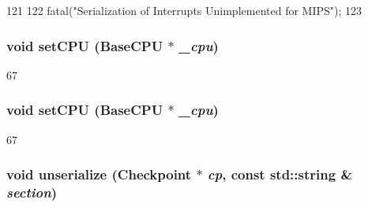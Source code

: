 \begin{DoxyCode}
121     {
122         fatal("Serialization of Interrupts Unimplemented for MIPS");
123     }
\end{DoxyCode}
\hypertarget{classMipsISA_1_1Interrupts_a2ab8c6aed9969bc58d6aa2427d442cc4}{
\subsubsection[{setCPU}]{\setlength{\rightskip}{0pt plus 5cm}void setCPU ({\bf BaseCPU} $\ast$ {\em \_\-cpu})}}
\label{classMipsISA_1_1Interrupts_a2ab8c6aed9969bc58d6aa2427d442cc4}



\begin{DoxyCode}
67     {}
\end{DoxyCode}
\hypertarget{classMipsISA_1_1Interrupts_a2ab8c6aed9969bc58d6aa2427d442cc4}{
\subsubsection[{setCPU}]{\setlength{\rightskip}{0pt plus 5cm}void setCPU ({\bf BaseCPU} $\ast$ {\em \_\-cpu})}}
\label{classMipsISA_1_1Interrupts_a2ab8c6aed9969bc58d6aa2427d442cc4}



\begin{DoxyCode}
67     {}
\end{DoxyCode}
\hypertarget{classMipsISA_1_1Interrupts_af22e5d6d660b97db37003ac61ac4ee49}{
\subsubsection[{unserialize}]{\setlength{\rightskip}{0pt plus 5cm}void unserialize ({\bf Checkpoint} $\ast$ {\em cp}, \/  const std::string \& {\em section})}}
\label{classMipsISA_1_1Interrupts_af22e5d6d660b97db37003ac61ac4ee49}



